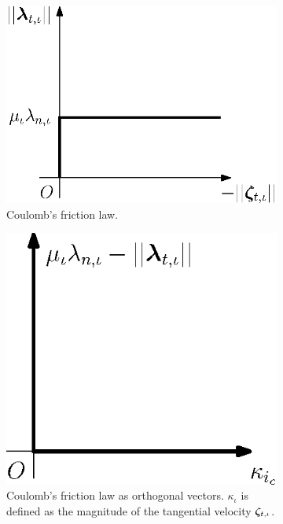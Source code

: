 \documentclass[../DC2017114Bouma.tex]{subfiles}
\begin{document}
\begin{figure}[h]
\centering
\begin{subfigure}{0.38\textwidth}
\centering
\includegraphics[width=\linewidth]{coulombfriction.eps}\caption{Coulomb's friction law.}\vspace{1.25cm}\label{fig:coulombfriction}
\end{subfigure}
\qquad
\begin{subfigure}{0.3\textwidth}
\centering
\includegraphics[width=\linewidth]{coulombort.eps}\caption{Coulomb's friction law as orthogonal vectors. $\kappa_{\iota}$ is defined as the magnitude of the tangential velocity $\boldsymbol{\zeta}_{t,\iota}$.}\label{fig:coulombort}
\end{subfigure}
\caption{}
\end{figure}
\end{document}
